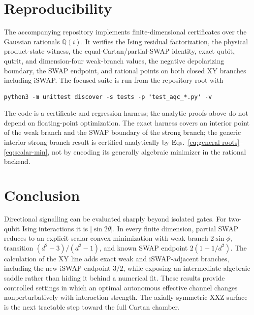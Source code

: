 \documentclass[11pt,a4paper]{article}
\theoremstyle{remark}
\begin{document}
\section{Reproducibility}

The accompanying repository implements finite-dimensional certificates over
the Gaussian rationals $\mathbb{Q}(i)$.  It verifies the Ising residual
factorization, the physical product-state witness, the equal-Cartan/partial-SWAP
identity, exact qubit, qutrit, and dimension-four weak-branch values, the
negative depolarizing boundary, the SWAP endpoint, and rational points on both
closed XY branches including iSWAP.  The focused suite is
run from the repository root with
\begin{verbatim}
python3 -m unittest discover -s tests -p 'test_aqc_*.py' -v
\end{verbatim}
The code is a certificate and regression harness; the analytic proofs above do
not depend on floating-point optimization.  The exact harness covers an
interior point of the weak branch and the SWAP boundary of the strong branch;
the generic interior strong-branch result is certified analytically by
Eqs.~\eqref{eq:general-roots}--\eqref{eq:scalar-min}, not by encoding its
generally algebraic minimizer in the rational backend.

\section{Conclusion}

Directional signalling can be evaluated sharply beyond isolated gates.
For two-qubit Ising interactions it is $|\sin2\theta|$.  In every finite
dimension, partial SWAP reduces to an explicit scalar convex minimization with
weak branch $2\sin\phi$, transition
$(d^2-3)/(d^2-1)$, and known SWAP endpoint $2(1-1/d^2)$.  The calculation
of the XY line adds exact weak and iSWAP-adjacent branches, including the new
iSWAP endpoint $3/2$, while exposing an intermediate algebraic saddle rather
than hiding it behind a numerical fit.  These results provide controlled
settings in which an optimal
autonomous effective channel changes nonperturbatively with interaction
strength.  The axially symmetric XXZ surface is the next tractable step toward
the full Cartan chamber.
\end{document}
